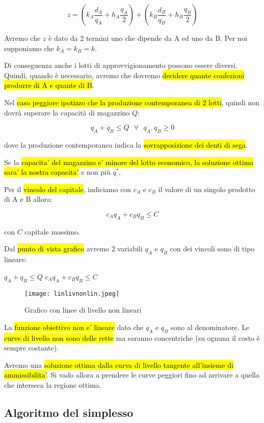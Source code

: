 $$z = (k_A \frac{d_A}{q_A} + h_A \frac{q_A}{2}) + (k_B \frac{d_B}{q_B} + h_B \frac{q_B}{2})$$


Avremo che $z$ è dato da 2 termini uno che dipende da A ed uno da B. Per noi supponiamo che $k_A = k_B = k$.

Di conseguenza anche i lotti di approvvigionamento possono essere diversi. Quindi, quando è necessario, avremo che dovremo \hl{decidere quante confezioni produrre di A e quante di B}.

Nel \hl{caso peggiore ipotizzo che la produzione contemporanea di 2 lotti}, quindi non dovrà superare la capacità di magazzino $Q$:

$$q_A + q_B \leq Q\ \ \ \forall\ \ \ q_A, q_B \geq 0$$

dove la produzione contemporanea indica la \hl{sovrapposizione dei denti di sega}.

Se la \hl{capacita' del magazzino e' minore del lotto economico, la soluzione ottima sara' la nostra capacita'} e non più $q^*$.

Per il \hl{vincolo del capitale}, indiciamo con $c_A$ e $c_B$ il valore di un singolo prodotto di A e B allora:

$$c_Aq_A + c_Bq_B \leq C$$

con $C$ capitale massimo.

Dal \hl{punto di vista grafico} avremo 2 variabili $q_A$ e $q_B$ con dei vincoli sono di tipo lineare:

$q_A + q_B \leq Q$
$c_Aq_A + c_Bq_B \leq C$


\begin{figure}[H]
\centering
\texttt{[image: linlivnonlin.jpeg]}
\caption{Grafico con linee di livello non lineari} 
\label{linlivnonlin}
\end{figure}


La \hl{funzione obiettivo non e' lineare} dato che $q_A$ e $q_B$ sono al denominatore. Le \hl{curve di livello non sono delle rette} ma saranno concentriche (su ognuna il costo è sempre costante).

Avremo una \hl{soluzione ottima dalla curva di livello tangente all'insieme di ammissibilita'}. Si vado allora a prendere le curve peggiori fino ad arrivare a quella che interseca la regione ottima.


\subsection{Algoritmo del simplesso}

